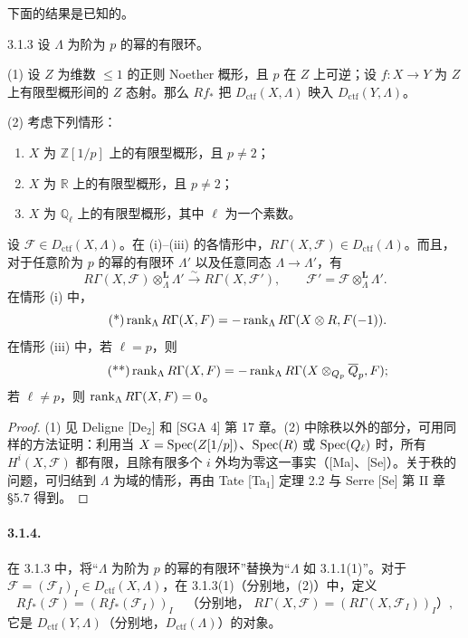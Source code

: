 下面的结果是已知的。
\begin{statement}{3.1.3}
设 $\Lambda$ 为阶为 $p$ 的幂的有限环。

(1) 设 $Z$ 为维数 $\le1$ 的正则 Noether 概形，且 $p$ 在 $Z$ 上可逆；设 $f:X\to Y$ 为 $Z$ 上有限型概形间的 $Z$ 态射。那么 $Rf_*$ 把 $D_{\mathrm{ctf}}(X,\Lambda)$ 映入 $D_{\mathrm{ctf}}(Y,\Lambda)$。

(2) 考虑下列情形：
\begin{enumerate}[label=(\roman*)]
\item $X$ 为 $\mathbb Z[1/p]$ 上的有限型概形，且 $p\ne2$；
\item $X$ 为 $\mathbb R$ 上的有限型概形，且 $p\ne2$；
\item $X$ 为 $\mathbb Q_\ell$ 上的有限型概形，其中 $\ell$ 为一个素数。
\end{enumerate}
设 $\mathcal F\in D_{\mathrm{ctf}}(X,\Lambda)$。在 (i)--(iii) 的各情形中，$R\Gamma(X,\mathcal F)\in D_{\mathrm{ctf}}(\Lambda)$。而且，对于任意阶为 $p$ 的幂的有限环 $\Lambda'$ 以及任意同态 $\Lambda\to\Lambda'$，有
\[
 R\Gamma(X,\mathcal F)\otimes^{\mathbf L}_\Lambda\Lambda'
 \xrightarrow{\sim}R\Gamma(X,\mathcal F'),
 \qquad\mathcal F'=\mathcal F\otimes^{\mathbf L}_\Lambda\Lambda'.
\]
在情形 (i) 中，
\begin{equation*}\tag{*}
 \operatorname{rank}_\Lambda R\Gamma(X,F)
 =-\operatorname{rank}_\Lambda R\Gamma(X\otimes R,F(-1)).
\end{equation*}
在情形 (iii) 中，若 $\ell=p$，则
\begin{equation*}\tag{**}
 \operatorname{rank}_\Lambda R\Gamma(X,F)
 =-\operatorname{rank}_\Lambda R\Gamma(X\otimes_{Q_p}\overline{Q}_p,F);
\end{equation*}
若 $\ell\ne p$，则 $\operatorname{rank}_\Lambda R\Gamma(X,F)=0$。
\end{statement}

\begin{proof}
(1) 见 Deligne [De$_2$] 和 [SGA 4] 第 17 章。(2) 中除秩以外的部分，可用同样的方法证明：利用当 $X=\operatorname{Spec}(Z[1/p])$、$\operatorname{Spec}(R)$ 或 $\operatorname{Spec}(Q_\ell)$ 时，所有 $H^i(X,\mathcal F)$ 都有限，且除有限多个 $i$ 外均为零这一事实（[Ma]、[Se]）。关于秩的问题，可归结到 $\Lambda$ 为域的情形，再由 Tate [Ta$_1$] 定理 2.2 与 Serre [Se] 第 II 章 §5.7 得到。
\end{proof}

\paragraph{3.1.4.} 在 3.1.3 中，将“$\Lambda$ 为阶为 $p$ 的幂的有限环”替换为“$\Lambda$ 如 3.1.1(1)”。对于 $\mathcal F=(\mathcal F_I)_I\in D_{\mathrm{ctf}}(X,\Lambda)$，在 3.1.3(1)（分别地，(2)）中，定义
\[
 Rf_*(\mathcal F)=(Rf_*(\mathcal F_I))_I
 \quad\text{（分别地， }R\Gamma(X,\mathcal F)=(R\Gamma(X,\mathcal F_I))_I\text{）},
\]
它是 $D_{\mathrm{ctf}}(Y,\Lambda)$（分别地，$D_{\mathrm{ctf}}(\Lambda)$）的对象。

